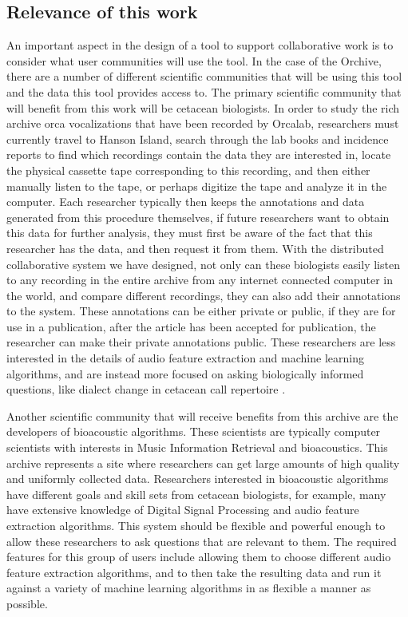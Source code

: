 \subsection{Relevance of this work}

An important aspect in the design of a tool to support collaborative
work is to consider what user communities will use the tool.  In the
case of the Orchive, there are a number of different scientific
communities that will be using this tool and the data this tool
provides access to.  The primary scientific community that will
benefit from this work will be cetacean biologists.  In order to study
the rich archive orca vocalizations that have been recorded by
Orcalab, researchers must currently travel to Hanson Island, search
through the lab books and incidence reports to find which recordings
contain the data they are interested in, locate the physical cassette
tape corresponding to this recording, and then either manually listen
to the tape, or perhaps digitize the tape and analyze it in the
computer.  Each researcher typically then keeps the annotations and
data generated from this procedure themselves, if future researchers
want to obtain this data for further analysis, they must first be
aware of the fact that this researcher has the data, and then request
it from them.  With the distributed collaborative system we have
designed, not only can these biologists easily listen to any recording
in the entire archive from any internet connected computer in the
world, and compare different recordings, they can also add their
annotations to the system.  These annotations can be either private or
public, if they are for use in a publication, after the article has
been accepted for publication, the researcher can make their private
annotations public.  These researchers are less interested in the
details of audio feature extraction and machine learning algorithms,
and are instead more focused on asking biologically informed
questions, like dialect change in cetacean call repertoire
\cite{deecke00}.

Another scientific community that will receive benefits from this
archive are the developers of bioacoustic algorithms.  These
scientists are typically computer scientists with interests in Music
Information Retrieval and bioacoustics.  This archive represents a
site where researchers can get large amounts of high quality and
uniformly collected data.  Researchers interested in bioacoustic
algorithms have different goals and skill sets from cetacean
biologists, for example, many have extensive knowledge of Digital
Signal Processing and audio feature extraction algorithms.  This
system should be flexible and powerful enough to allow these
researchers to ask questions that are relevant to them.  The required
features for this group of users include allowing them to choose
different audio feature extraction algorithms, and to then take the
resulting data and run it against a variety of machine learning
algorithms in as flexible a manner as possible.

